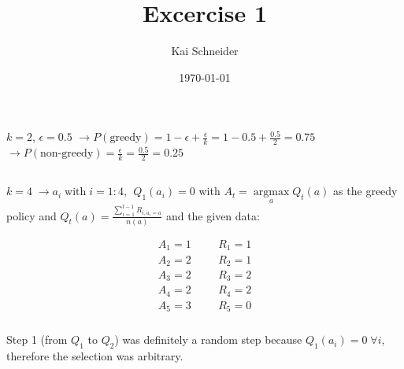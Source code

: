 \documentclass[11pt,a4paper]{article}
\title{Excercise 1}
\author{Kai Schneider}
\date{\today}
\begin{document}
 

\maketitle

\section{}

\subsection{}

$k = 2$, $\epsilon=0.5$ \newline
$\rightarrow P(\textrm{greedy})=1-\epsilon+\frac{\epsilon}{k}=1-0.5+\frac{0.5}{2}=0.75$ \newline
$\rightarrow P(\textrm{non-greedy})=\frac{\epsilon}{k}=\frac{0.5}{2}=0.25$

\subsection{}

$k=4 \; \rightarrow a_{i} \; \textrm{with} \; i=1:4$,  $\; Q_{1}(a_{i})=0$ \newline
with $A_{t}=\underset{a}{\operatorname{argmax}}Q_{t}(a)$ as the greedy policy and 
$Q_{t}(a)=\frac{\sum\limits_{i=1}^{t-1} R_{i,a_{i}=a}}{n(a)}$ and the given data:\newline

\begin{align*}
    A_{1}=1 \;\;\;\;\;\; & R_{1}=1 \\
    A_{2}=2 \;\;\;\;\;\; & R_{2}=1 \\
    A_{3}=2 \;\;\;\;\;\; & R_{3}=2 \\
    A_{4}=2 \;\;\;\;\;\; & R_{4}=2 \\
    A_{5}=3 \;\;\;\;\;\; & R_{5}=0
\end{align*}

\subsubsection{}

Step 1 (from $Q_{1}$ to $Q_{2}$) was definitely a random step because $Q_{1}(a_{i})=0 \; \forall i$, therefore the selection was arbitrary.
\end{document}
